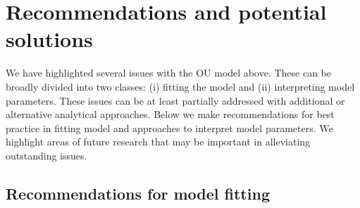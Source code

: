 \documentclass[a4paper,12pt]{article}
\begin{document}
\section{Recommendations and potential solutions}

  We have highlighted several issues with the OU model above. These can be broadly divided into two classes: (i) fitting the model and (ii) interpreting model parameters. These issues can be at least partially addressed with additional or alternative analytical approaches. Below we make recommendations for best practice in fitting model and approaches to interpret model parameters. We highlight areas of future research that may be important in alleviating outstanding issues.
  
  \subsection{Recommendations for model fitting}
\end{document}
